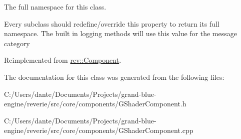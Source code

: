 The full namespace for this class. 

Every subclass should redefine/override this property to return its full namespace. The built in logging methods will use this value for the message category 

Reimplemented from \mbox{\hyperlink{classrev_1_1_component_ae2827b14c278588b95e01c4743fae674}{rev\+::\+Component}}.



The documentation for this class was generated from the following files\+:\begin{DoxyCompactItemize}
\item 
C\+:/\+Users/dante/\+Documents/\+Projects/grand-\/blue-\/engine/reverie/src/core/components/G\+Shader\+Component.\+h\item 
C\+:/\+Users/dante/\+Documents/\+Projects/grand-\/blue-\/engine/reverie/src/core/components/G\+Shader\+Component.\+cpp\end{DoxyCompactItemize}
